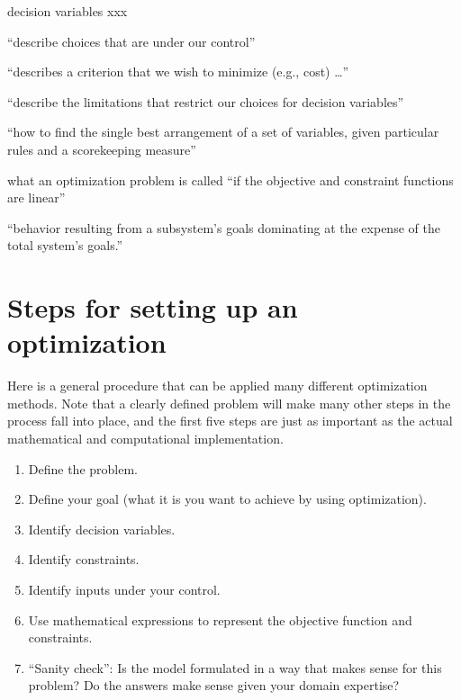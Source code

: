 \documentclass[10pt]{article}
\begin{document}
\begin{labeling}{decision variables xxx}
\item [\textbf{decision variables}] ``describe  choices that are under our control''\cite{James_Orlin2013-xb}
\item [\textbf{objective function}] ``describes a criterion that we wish to minimize (e.g., cost) \ldots''\cite{James_Orlin2013-xb}
\item [\textbf{constraints}] ``describe the limitations that restrict our choices for decision variables''\cite{James_Orlin2013-xb}
\item [\textbf{constrained optimization problem}] ``how to find the single best arrangement of a set of variables, given particular rules and a scorekeeping measure''\cite{Christian2016-ug}
\item [\textbf{linear program}] what an optimization problem is called ``if the objective and constraint functions are linear''\cite{boyd}
\item [\textbf{suboptimization}] ``behavior resulting from a subsystem's goals dominating at the expense of the total system's goals.''\cite{meadows}\\
\end{labeling}

\section{Steps for setting up an optimization}

Here is a general procedure that can be applied many different optimization methods. Note that a clearly defined problem will make many other steps in the process fall into place, and the first five steps are just as important as the actual mathematical and computational implementation.  

\begin{enumerate}
\item Define the problem.
\item Define your goal (what it is you want to achieve by using optimization).
\item Identify decision variables.
\item Identify constraints.
\item Identify inputs under your control.
\item Use mathematical expressions to represent the objective function and constraints.
\item ``Sanity check'': Is the model formulated in a way that makes sense for this problem? Do the answers make sense given your domain expertise?
\end{enumerate}
\end{document}
